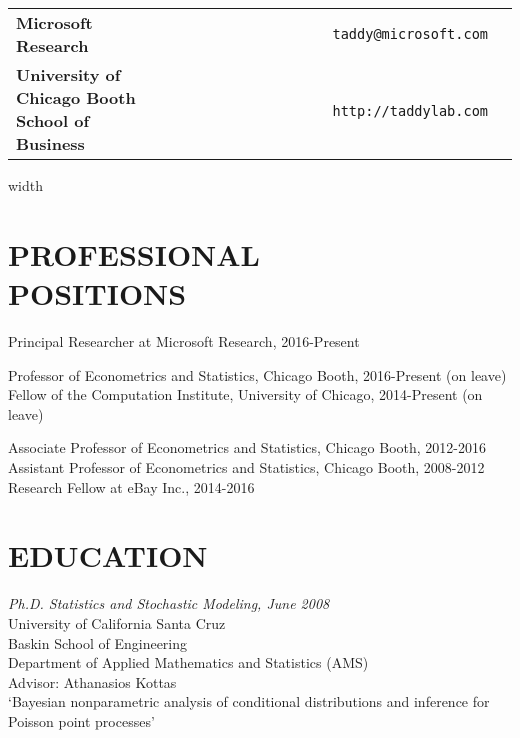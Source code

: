 \documentclass[margin,line]{res}
\begin{document}

\begin{resume}

\medskip
\section{} 
\vspace{.05in}
\begin{tabular}{@{}p{3in}rp{2in}}
{\bf Microsoft Research} & {\tt taddy@microsoft.com}\\
{\bf University of Chicago Booth School of Business} & ~~~~~~~~~~~~~~~~~~~~~~{\tt http://taddylab.com}
\end{tabular}



\vspace{.5cm}
\leaders\vrule width \textwidth\vskip0.4pt


\section{\bf PROFESSIONAL\\ POSITIONS}

Principal Researcher at Microsoft Research, 2016-Present

\vspace{-.2cm}
Professor of Econometrics and Statistics, Chicago Booth,
2016-Present (on leave)\\
Fellow of the Computation Institute, University of Chicago, 2014-Present (on leave)

\vspace{-.2cm}
Associate Professor of Econometrics and Statistics, Chicago Booth,
2012-2016\\
Assistant Professor of Econometrics and Statistics, Chicago Booth,
2008-2012\\
Research Fellow at eBay Inc., 2014-2016


\section{\bf EDUCATION}

{\it Ph.D. Statistics and Stochastic Modeling, June 2008}\\
{\sc University of California Santa Cruz}\\
Baskin School of Engineering\\
Department of Applied Mathematics and Statistics (AMS)\\
Advisor: Athanasios Kottas\\
`Bayesian nonparametric analysis of conditional distributions and inference for Poisson point processes'


\end{resume}
\end{document}
